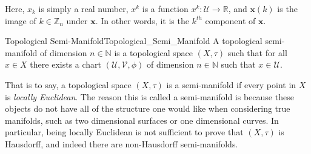     Here, $x_{k}$ is simply a real number, $x^{k}$ is a function
    $x^{k}:\mathcal{U}\rightarrow\mathbb{R}$, and $\mathbf{x}(k)$ is the image
    of $k\in\mathbb{Z}_{n}$ under $\mathbf{x}$. In other words, it is the
    $k^{th}$ component of $\mathbf{x}$.
    \begin{fdefinition}{Topological Semi-Manifold}{Topological_Semi_Manifold}
        A topological semi-manifold of dimension $n\in\mathbb{N}$ is a
        topological space $(X,\tau)$ such that for all $x\in{X}$ there exists a
        chart $(\mathcal{U},\mathcal{V},\phi)$ of dimension $n\in\mathbb{N}$
        such that $x\in\mathcal{U}$.
    \end{fdefinition}
    That is to say, a topological space $(X,\tau)$ is a semi-manifold if every
    point in $X$ is \textit{locally Euclidean}. The reason this is called a
    semi-manifold is because these objects do not have all of the structure one
    would like when considering true manifolds, such as two dimensional surfaces
    or one dimensional curves. In particular, being locally Euclidean is not
    sufficient to prove that $(X,\tau)$ is Hausdorff, and indeed there are
    non-Hausdorff semi-manifolds.
